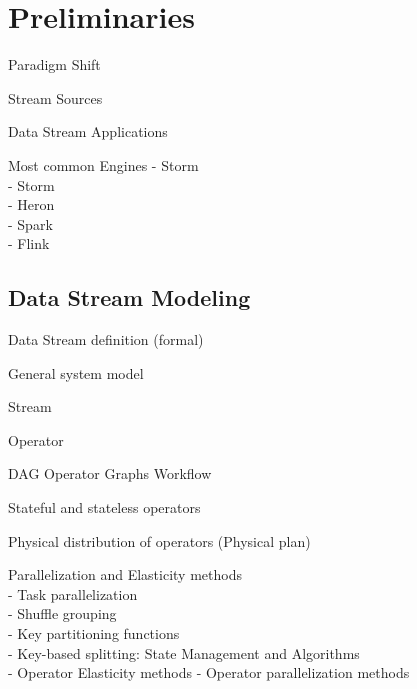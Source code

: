 \chapter{Preliminaries
  \label{chapter:preliminaries}}

  Paradigm Shift\cite{chakravarthy2009stream}

  Stream Sources  \cite{kamburugamuve2013survey}

  Data Stream Applications\cite{chakravarthy2009stream}

  Most common Engines  \cite{kamburugamuve2013survey}
  - Storm  \cite{kamburugamuve2013survey}\\
  - Storm \cite{R_ger_2019}\\
  - Heron \cite{R_ger_2019}\\
  - Spark \cite{R_ger_2019}\\
  - Flink \cite{R_ger_2019}

  \section{Data Stream Modeling}
  Data Stream definition (formal) \cite{KottoKombi2015ParallelAD}

  General system model \cite{R_ger_2019}

  Stream  \cite{kamburugamuve2013survey}

  Operator  \cite{kamburugamuve2013survey}

  DAG  \cite{kamburugamuve2013survey}
  Operator Graphs \cite{R_ger_2019}
  Workflow  \cite{KottoKombi2015ParallelAD}

  Stateful and stateless operators  \cite{KottoKombi2015ParallelAD}

  Physical distribution of operators (Physical plan)  \cite{kamburugamuve2013survey}

  Parallelization and Elasticity methods \cite{R_ger_2019}\\
  - Task parallelization \cite{R_ger_2019}\\
  - Shuffle grouping \cite{R_ger_2019}\\
  - Key partitioning functions \cite{R_ger_2019}\\
  - Key-based splitting: State Management and Algorithms \cite{R_ger_2019}\\
  - Operator Elasticity methods \cite{R_ger_2019}
  - Operator parallelization methods \cite{R_ger_2019}

